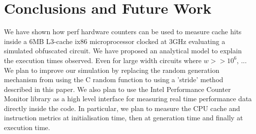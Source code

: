 \section{Conclusions and Future Work}
We have shown how perf hardware counters can be used to measure cache hits inside a 6MB L3-cache ix86 microprocessor clocked at 3GHz evaluating a simulated obfuscated circuit. We have proposed an analytical model to explain the execution times observed. Even for large width circuits where $w >> 10^6$, ...
We plan to improve our simulation by replacing the random generation mechanism from using the C random function to using a 'stride' method described in this paper. 
We also plan to use the Intel Performance Counter Monitor library as a high level interface for measuring real time performance data directly inside the code. In particular, we plan to measure the CPU cache and instruction metrics at initialisation time, then at generation time and finally at execution time.